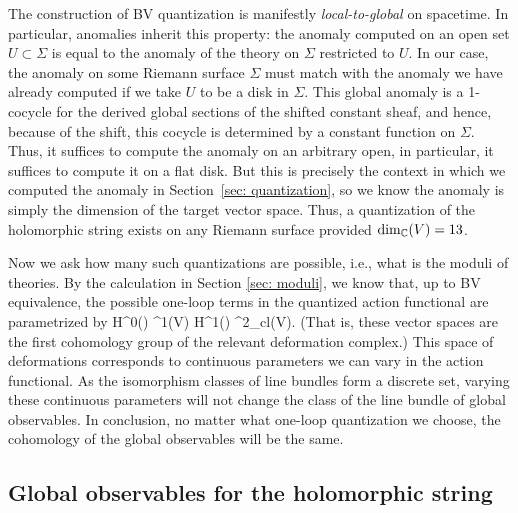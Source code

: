 The construction of BV quantization is manifestly {\em local-to-global} on spacetime. 
In particular, anomalies inherit this property: the anomaly computed on an open set $U \subset \Sigma$ is equal to the anomaly of the theory on $\Sigma$ restricted to $U$. 
In our case, the anomaly on some Riemann surface $\Sigma$ must match with the anomaly we have already computed if we take $U$ to be a disk in $\Sigma$.
This global anomaly is a 1-cocycle for the derived global sections of the shifted constant sheaf, 
and hence, because of the shift, this cocycle is determined by a constant function on $\Sigma$.
Thus, it suffices to compute the anomaly on an arbitrary open, 
in particular, it suffices to compute it on a flat disk. 
But this is precisely the context in which we computed the anomaly in Section~\ref{sec: quantization}, 
so we know the anomaly is simply the dimension of the target vector space.
Thus, a quantization of the holomorphic string exists on any Riemann surface provided $\dim_{\mathbb C}(V) = 13$. 

Now we ask how many such quantizations are possible,
i.e., what is the moduli of theories.
By the calculation in Section \ref{sec: moduli}, 
we know that, up to BV equivalence, 
the possible one-loop terms in the quantized action functional are parametrized by
\ben
H^0(\Sigma) \tensor \Omega^1(V) \oplus H^1(\Sigma) \tensor \Omega^2_{cl}(V).
\een 
(That is, these vector spaces are the first cohomology group of the relevant deformation complex.)
This space of deformations corresponds to continuous parameters we can vary in the action functional.
As the isomorphism classes of line bundles form a discrete set, 
varying these continuous parameters will not change the class of the line bundle of global observables. 
In conclusion, no matter what one-loop quantization we choose, 
the cohomology of the global observables will be the same.


\subsection{Global observables for the holomorphic string}

